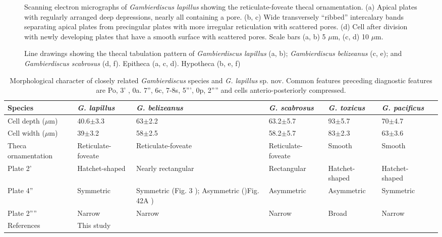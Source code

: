 \documentclass[12pt]{article}
\begin{document}
\begin{figure} 
\caption{Scanning electron micrographs of \textit{Gambierdiscus lapillus} showing the reticulate-foveate thecal ornamentation. (a) Apical plates with regularly arranged deep depressions, nearly all containing a pore. (b, c) Wide transversely “ribbed” intercalary bands separating apical plates from precingular plates with more irregular reticulation with scattered pores. (d) Cell after division with newly developing plates that have a smooth surface with scattered pores. Scale bars (a, b) 5 $\mu$m, (c, d) 10 $\mu$m.} 
\label{fig:ornSEM}
\end{figure} 

\begin{figure} 
\caption{Line drawings showing the thecal tabulation pattern of \textit{Gambierdiscus lapillus} (a, b); \textit{Gambierdiscus belizeanus} (c, e); and \textit{Gambierdiscus scabrosus} (d, f). Epitheca (a, c, d). Hypotheca (b, e, f)} 
\label{fig:DrawMorph}
\end{figure}

\begin{table}
\caption{Morphological character of closely related \textit{Gambierdiscus} species and \textit{G. lapillus} sp. nov. Common features preceding diagnostic features are Po, 3' , 0a. 7'', 6c, 7-8s, 5''', 0p, 2'''' and cells anterio-posteriorly compressed.}
\label{tbl:MorphTable}
\begin{tabular}{ | p{2cm} | p{2.5cm} | p{2.5cm} | p{2.5cm} |  p{2.5cm} | p{2.5cm} |p{2.5cm} |}
\hline
Species&\textit{G. lapillus}&\textit{G. belizeanus}&\textit{G. scabrosus}& \textit{G. toxicus}&\textit{G. pacificus}\\
 \hline
Cell depth ($\mu$m)&40.6$\pm$3.3&63$\pm$2.2&63.2$\pm$5.7&93$\pm$5.7&70$\pm$4.7\\
\hline
Cell width ($\mu$m)&39$\pm$3.2&58$\pm$2.5&58.2$\pm$5.7&83$\pm$2.3&63$\pm$3.6\\
\hline
Theca ornamentation&Reticulate-foveate&Reticulate-foveate&Reticulate-foveate&Smooth&Smooth\\
\hline
Plate 2'&Hatchet-shaped&Nearly rectangular&Rectangular&Hatchet-shaped&Hatchet-shaped\\
 \hline
 Plate 4''&Symmetric&Symmetric (Fig. 3 \citep{faust1995observation}); Asymmetric ()Fig. 42A \citep{hoppenrath2014marine})&Asymmetric&Asymmetric&Symmetric\\
 \hline
 Plate 2''''&Narrow&Narrow&Narrow&Broad&Narrow\\
 \hline
 References&This study&\citep{faust1995observation,litaker2009taxonomy,chinain1999morphology,chinain1999seasonal}&\citep{kuno2010genetic,nishimura2013genetic,nishimura2014morphology}&\citep{adachi1979thecal,litaker2009taxonomy,chinain1997intraspecific,richlen2008phylogeography}&\citep{litaker2009taxonomy,chinain1999morphology,chinain1999seasonal}\\
 \hline
\end{tabular}
\end{table}
\end{document}

